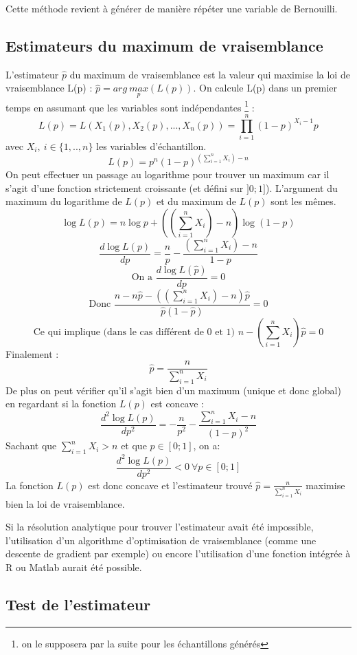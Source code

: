 \documentclass[12pt,a4paper,titlepage]{article}
\numberwithin{equation}{section}
\begin{document}


Cette méthode revient à générer de manière répéter
une variable de Bernouilli.


\subsection{Estimateurs du maximum de vraisemblance}

L'estimateur $\hat{p}$ du maximum de vraisemblance est la valeur qui
maximise la loi de vraisemblance L(p) : $\hat{p}=arg\ \underset{p}{max}(L(p))$.
On calcule L(p) dans un premier temps en assumant que les variables sont indépendantes \footnote{on le supposera par la suite pour les échantillons générés} :
\[L(p)=L(X_1(p),X_2(p),...,X_n(p))=\prod\limits_{i=1}^{n}(1-p)^{X_i-1}p 
\]
avec $X_i,\ i\in\{1,..,n\}$ les variables d'échantillon.
\[L(p)=p^n(1-p)^{(\sum\limits_{i=1}^{n}X_i)-n}\]
On peut effectuer un passage au logarithme pour trouver un maximum car il s'agit
d'une fonction strictement croissante (et défini sur $]0;1]$). L'argument du maximum du logarithme
de $L(p)$ et du maximum de $L(p)$ sont les mêmes.
\[\log{L(p)}=n\log{p}+((\sum\limits_{i=1}^{n}X_i)-n)\log{(1-p)}\]
\[\frac{d\log{L(p)}}{dp}=\frac{n}{p}-\frac{(\sum\limits_{i=1}^{n}X_i)-n}{1-p}\]
\[\text{On a }\frac{d\log{L(\hat{p})}}{dp}=0\]
\[\text{Donc }\frac{n-n\hat{p}-((\sum\limits_{i=1}^{n}X_i)-n)\hat{p}}{\hat{p}(1-\hat{p})}=0\]
\[\text{Ce qui implique (dans le cas différent de 0 et 1) }n-(\sum\limits_{i=1}^{n}X_i)\hat{p}=0\]
Finalement :
\[\hat{p} = \frac{n}{\sum\limits_{i=1}^{n}X_i}\]
De plus on peut vérifier qu'il s'agit bien d'un maximum (unique et donc global) en regardant si la fonction $L(p)$ est concave :
\[\frac{d^2\log{L(p)}}{dp^2} = -\frac{n}{p^2}-\frac{\sum\limits_{i=1}^{n}X_i-n}{(1-p)^2}\]
Sachant que $\sum\limits_{i=1}^{n}X_i > n $
et que $p\in[0;1]$, on a:
\[\frac{d^2 \log{L(p)}}{dp^2}<0 \ \forall p\in[0;1]\]
La fonction $L(p)$ est donc concave et l'estimateur trouvé $\hat{p} = \frac{n}{\sum\limits_{i=1}^{n}X_i}$ maximise bien la loi de vraisemblance.

Si la résolution analytique pour trouver l'estimateur avait été impossible,
l'utilisation d'un algorithme d'optimisation de vraisemblance (comme une descente de gradient par exemple) ou encore
l'utilisation d'une fonction intégrée à R ou Matlab aurait été possible.

\subsection{Test de l'estimateur}
\end{document}

